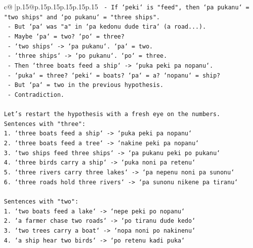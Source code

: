 \documentclass{article}
\begin{document}
{\begin{supertabular}{c@{$\;$}|p{.15\linewidth}@{}p{.15\linewidth}p{.15\linewidth}p{.15\linewidth}p{.15\linewidth}p{.15\linewidth}}
{{{\texttt{                    {-} If `peki` is "feed", then `pa pukanu` = "two ships" and `po pukanu` = "three ships".} \\
\texttt{                    {-} But `pa` was "a" in `pa kedonu dude tira` (a road...).} \\
\texttt{                    {-} Maybe `pa` = two? `po` = three?} \\
\texttt{                    {-} `two ships` {-}> `pa pukanu`. `pa` = two.} \\
\texttt{                    {-} `three ships` {-}> `po pukanu`. `po` = three.} \\
\texttt{                    {-} Then `three boats feed a ship` {-}> `puka peki pa nopanu`.} \\
\texttt{                      {-} `puka` = three? `peki` = boats? `pa` = a? `nopanu` = ship?} \\
\texttt{                      {-} But `pa` = two in the previous hypothesis.} \\
\texttt{                      {-} Contradiction.} \\
\\ 
\texttt{Let's restart the hypothesis with a fresh eye on the numbers.} \\
\texttt{Sentences with "three":} \\
\texttt{1. `three boats feed a ship` {-}> `puka peki pa nopanu`} \\
\texttt{2. `three boats feed a tree` {-}> `nakine peki pa nopanu`} \\
\texttt{3. `two ships feed three ships` {-}> `pa pukanu peki po pukanu`} \\
\texttt{4. `three birds carry a ship` {-}> `puka noni pa retenu`} \\
\texttt{5. `three rivers carry three lakes` {-}> `pa nepenu noni pa sunonu`} \\
\texttt{6. `three roads hold three rivers` {-}> `pa sunonu nikene pa tiranu`} \\
\\ 
\texttt{Sentences with "two":} \\
\texttt{1. `two boats feed a lake` {-}> `nepe peki po nopanu`} \\
\texttt{2. `a farmer chase two roads` {-}> `po tiranu dude kedo`} \\
\texttt{3. `two trees carry a boat` {-}> `nopa noni po nakinenu`} \\
\texttt{4. `a ship hear two birds` {-}> `po retenu kadi puka`} \\
\\ 
}}}
\end{supertabular}}
\end{document}
